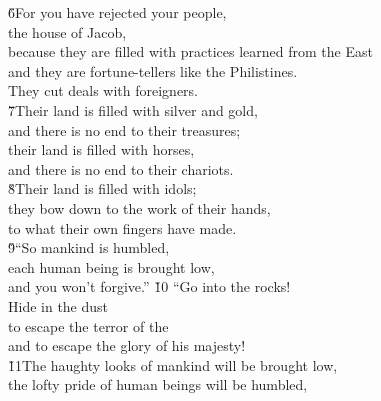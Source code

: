 \begin{poetry}
\poeml \v{6}For you have rejected your people, \\
\poeml the house of Jacob, \\
\poeml because they are filled with practices learned from the East \\
\poeml and they are fortune-tellers like the Philistines. \\
\poeml They cut deals with foreigners. \\
\poeml \v{7}Their land is filled with silver and gold, \\
\poeml and there is no end to their treasures; \\
\poeml their land is filled with horses, \\
\poeml and there is no end to their chariots. \\
\poeml \v{8}Their land is filled with idols; \\
\poeml they bow down to the work of their hands, \\
\poemlll       to what their own fingers have made. \\
\poeml \v{9}``So mankind is humbled, \\
\poemll    each human being is brought low, \\
\poemlll       and you won't forgive.''
\poeml \v{10} ``Go into the rocks! \\
\poemll    Hide in the dust \\
\poeml to escape the terror of the  \\
\poemll    and to escape the glory of his majesty! \\
\poeml \v{11}The haughty looks of mankind will be brought low, \\
\poemll    the lofty pride of human beings will be humbled, \\

\end{poetry}
